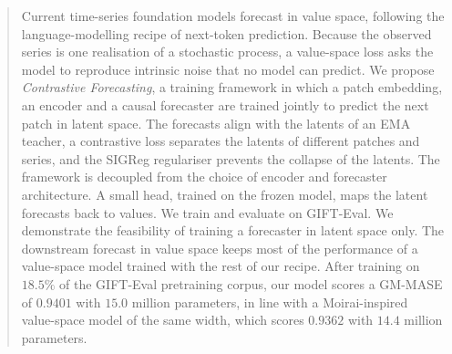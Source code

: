 \begin{abstract}
  Current time-series foundation models forecast in value space,
  following the language-modelling recipe of next-token prediction.
  Because the observed series is one realisation of a stochastic
  process, a value-space loss asks the model to reproduce intrinsic
  noise that no model can predict. We propose \emph{Contrastive
  Forecasting}, a training framework in which a patch embedding, an
  encoder and a causal forecaster are trained jointly to predict the
  next patch in latent space. The forecasts align with the latents of
  an EMA teacher, a contrastive loss separates the latents of
  different patches and series, and the SIGReg regulariser prevents
  the collapse of the latents. The framework is decoupled from the
  choice of encoder and forecaster architecture. A small head, trained
  on the frozen model, maps the latent forecasts back to values. We
  train and evaluate on GIFT-Eval. We demonstrate the feasibility of
  training a forecaster in latent space only. The downstream forecast
  in value space keeps most of the performance of a value-space model
  trained with the rest of our recipe. After training on $18.5\%$ of the
  GIFT-Eval pretraining corpus, our model scores a GM-MASE of
  $0.9401$ with $15.0$ million parameters, in line with a
  Moirai-inspired value-space model of the same width, which scores
  $0.9362$ with $14.4$ million parameters.
\end{abstract}

